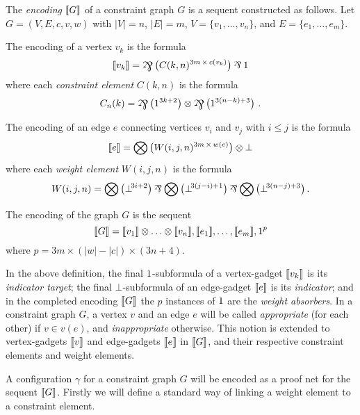 \documentclass{lmcs}
\begin{document}
\begin{definition}
\label{def:graph encoding}
The \emph{encoding} $\llbracket G\rrbracket$ of a constraint graph $G$ is a sequent constructed as follows. 
Let $G=(V,E,c,v,w)$ with $|V|=n$, $|E|=m$, $V=\{v_1,\dotsc,v_n\}$, and $E=\{e_1,\dotsc,e_m\}$.

\noindent
The encoding of a vertex $v_k$ is the formula
\[
	\itn{v_k} = \bigparr\big(C(k,n)^{3m\,\times\,c(v_k)} \big)\pr\1
\]
where each \emph{constraint element} $C(k,n)$ is the formula
\[
	C_n(k) = \bigparr\big(1^{3k+2}\big) \tn \bigparr\big(1^{3(n-k)+3}\big)~.
\]

\noindent
The encoding of an edge $e$ connecting vertices $v_i$ and $v_j$ with $i\leq j$ is the formula
\[
	\llbracket e\rrbracket = \bigotimes\big(W(i,j,n)^{3m\,\times\,w(e)}\big)\otimes\bot
\]
where each \emph{weight element} $W(i,j,n)$ is the formula
\[
	W(i,j,n) = \bigtn\big(\bot\!^{3i+2}\big)\pr\bigtn\big(\bot\!^{3(j-i)+1}\big)\pr\bigtn\big(\bot\!^{3(n-j)+3}\big)\,.
\]

\noindent
The encoding of the graph $G$ is the sequent
\[
	\llbracket G\rrbracket = \llbracket v_1\rrbracket\otimes\dotso\otimes\llbracket v_n\rrbracket, \llbracket e_1\rrbracket,\dotsc,\llbracket e_m\rrbracket, 1^p
\]
where $p=3m\times(|w|-|c|)\times(3n+4)$.

\end{definition}



In the above definition, the final $1$-subformula of a vertex-gadget $\llbracket v_k\rrbracket$ is its \emph{indicator target}; the final $\bot$-subformula of an edge-gadget $\llbracket e\rrbracket$ is its \emph{indicator}; and in the completed encoding $\llbracket G\rrbracket$ the $p$ instances of $1$ are the \emph{weight absorbers}.
%
In a constraint graph $G$, a vertex $v$ and an edge $e$ will be called \emph{appropriate} (for each other) if $v\in v(e)$, and \emph{inappropriate} otherwise.
%
This notion is extended to vertex-gadgets $\llbracket v\rrbracket$ and edge-gadgets $\llbracket e\rrbracket$ in $\llbracket G\rrbracket$, and their respective constraint elements and weight elements.



A configuration $\gamma$ for a constraint graph $G$ will be encoded as a proof net for the sequent $\llbracket G\rrbracket$.
%
Firstly we will define a standard way of linking a weight element to a constraint element.
\end{document}
